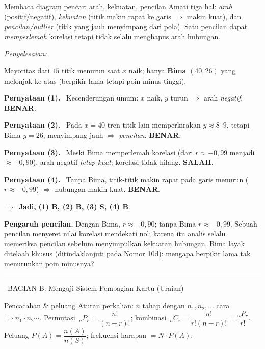 \documentclass[11pt,a4paper]{article}
\newcommand{\jawab}{\par\smallskip\noindent\textit{\textcolor{oranye}{Penyelesaian:}}\par\smallskip}
\newcommand{\jadi}{\par\smallskip\noindent$\Rightarrow$\ \textbf{Jadi, }}
\newcommand{\benar}{\textbf{\textcolor{hijau}{BENAR}}}
\newcommand{\salah}{\textbf{\textcolor{merah}{SALAH}}}
\newcommand{\pernyataan}[1]{\par\smallskip\noindent\textbf{Pernyataan (#1).}\ }
\newcommand{\bagianjudul}[1]{\par\bigskip\noindent%
  {\large\bfseries\color{ungu}\rule[-2pt]{4pt}{16pt}\ #1}\par\smallskip}
\begin{document}
\begin{ingat}{Membaca diagram pencar: arah, kekuatan, pencilan}
Amati tiga hal: \emph{arah} (positif/negatif), \emph{kekuatan} (titik makin rapat
ke garis $\Rightarrow$ makin kuat), dan \emph{pencilan/outlier} (titik yang jauh
menyimpang dari pola). Satu pencilan dapat \emph{memperlemah} korelasi tetapi
tidak selalu menghapus arah hubungan.
\end{ingat}

\jawab
Mayoritas dari $15$ titik menurun saat $x$ naik; hanya \textbf{Bima} $(40,26)$ yang
melonjak ke atas (berpikir lama tetapi poin minus tinggi).

\pernyataan{1} Kecenderungan umum: $x$ naik, $y$ turun $\Rightarrow$ arah
\emph{negatif}. \benar.

\pernyataan{2} Pada $x=40$ tren titik lain memperkirakan $y\approx8$--$9$, tetapi
Bima $y=26$, menyimpang jauh $\Rightarrow$ \emph{pencilan}. \benar.

\pernyataan{3} Meski Bima memperlemah korelasi (dari $r\approx-0{,}99$ menjadi
$\approx-0{,}90$), arah negatif \emph{tetap kuat}; korelasi tidak hilang. \salah.

\pernyataan{4} Tanpa Bima, titik-titik makin rapat pada garis menurun
($r\approx-0{,}99$) $\Rightarrow$ hubungan makin kuat. \benar.

\jadi \textbf{(1) B, (2) B, (3) S, (4) B}.

\begin{tips}
\textbf{Pengaruh pencilan.} Dengan Bima, $r\approx-0{,}90$; tanpa Bima
$r\approx-0{,}99$. Sebuah pencilan menyeret nilai korelasi mendekati nol; karena
itu analis selalu memeriksa pencilan sebelum menyimpulkan kekuatan hubungan. Bima
layak ditelaah khusus (ditindaklanjuti pada Nomor 10d): mengapa berpikir lama tak
menurunkan poin minusnya?
\end{tips}

\bagianjudul{BAGIAN B: Menguji Sistem Pembagian Kartu (Uraian)}

\begin{ingat}{Pencacahan \& peluang}
Aturan perkalian: $n$ tahap dengan $n_1,n_2,\dots$ cara $\Rightarrow n_1\cdot
n_2\cdots$. Permutasi $\,_nP_r=\dfrac{n!}{(n-r)!}$; kombinasi
$\,_nC_r=\dfrac{n!}{r!(n-r)!}=\dfrac{{}_nP_r}{r!}$.
Peluang $P(A)=\dfrac{n(A)}{n(S)}$; frekuensi harapan $=N\cdot P(A)$.
\end{ingat}
\end{document}
